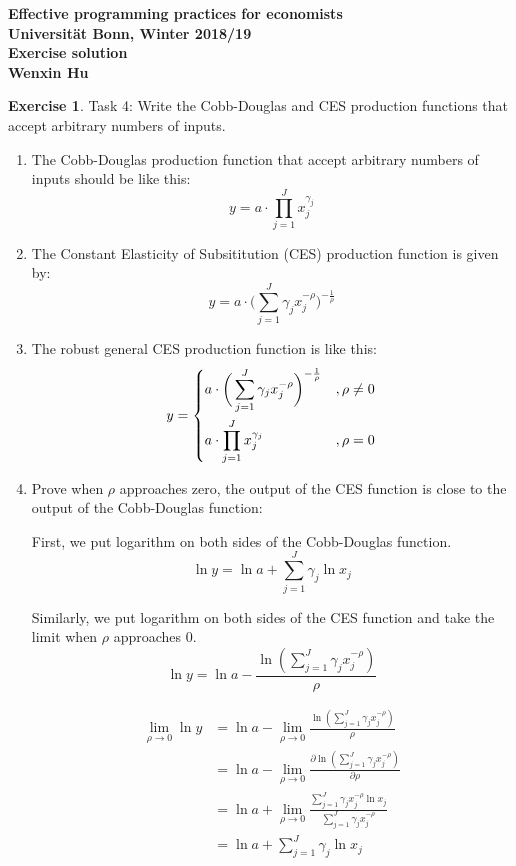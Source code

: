 \documentclass[11pt,a4paper,leqno]{article}
\theoremstyle{definition}
\newtheorem{exercise}{Exercise}
\begin{document}
\begin{center}
    \begin{large}
        \textbf{
        Effective programming practices for economists\\
        Universität Bonn, Winter 2018/19 \\[2ex]
        Exercise solution\\[2ex]
        Wenxin Hu
        }
    \end{large}
\end{center}


\begin{exercise}
    Task 4: Write the Cobb-Douglas and CES production functions that accept arbitrary numbers of inputs.
    \begin{enumerate}
        \item The Cobb-Douglas production function that accept arbitrary numbers of inputs should be like this:
        $$y = a \cdot \prod_{j=1}^J x_j^{\gamma_j}$$
        \item The Constant Elasticity of Subsititution (CES) production function is given by:
        $$y = a \cdot \bigg(\sum_{j=1}^J \gamma_j x_j^{-\rho} \bigg)^{-\frac{1}{\rho}}$$
        \item The robust general CES production function is like this:
        \[
            y = \begin{dcases}
            a \cdot \bigg(\sum_{j=1}^J \gamma_j x_j^{-\rho} \bigg)^{-\frac{1}{\rho}} & , \rho \neq 0 \\
            a \cdot \prod_{j=1}^J x_j^{\gamma_j} & , \rho = 0 \\
            \end{dcases}
        \]
        \item Prove when $\rho$ approaches zero, the output of the CES function is close to the output of the Cobb-Douglas function:

        First, we put logarithm on both sides of the Cobb-Douglas function.
        $$ \ln y = \ln a + \sum_{j=1}^J \gamma_j \ln x_j$$

        Similarly, we put logarithm on both sides of the CES function and take the limit when $\rho$ approaches 0.
        $$\ln y = \ln a - \frac{\ln (\sum_{j=1}^J\gamma_jx_j^{-\rho})}{\rho}$$

        \begin{align*}
            \lim_{\rho \rightarrow 0} \ln y &= \ln a - \lim_{\rho \rightarrow 0} \frac{\ln(\sum_{j=1}^J\gamma_jx_j^{-\rho})}{\rho}\\ 
            &= \ln a - \lim_{\rho \rightarrow 0} \frac{\partial \ln(\sum_{j=1}^J\gamma_jx_j^{-\rho})}{\partial \rho} \\
            &= \ln a + \lim_{\rho \rightarrow 0} \frac{\sum_{j=1}^J\gamma_jx_j^{-\rho} \ln x_j}{\sum_{j=1}^J\gamma_jx_j^{-\rho}}\\
            &= \ln a + \sum_{j=1}^J \gamma_j \ln x_j
        \end{align*}


\end{enumerate}
\end{exercise}
\end{document}
